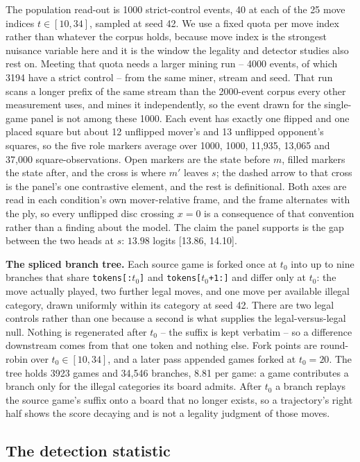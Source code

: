 The population read-out is 1000 strict-control events, 40 at each of the 25 move indices $t \in
[10, 34]$, sampled at seed 42. We use a fixed quota per move index rather than whatever the
corpus holds, because move index is the strongest nuisance variable here and it is the window the
legality and detector studies also rest on. Meeting that quota needs a larger mining run -- 4000
events, of which 3194 have a strict control -- from the same miner, stream and seed. That run scans a longer prefix of
the same stream than the 2000-event corpus every other measurement uses, and mines it
independently, so the event drawn for the single-game panel is not among these 1000. Each event has exactly one
flipped and one placed square but about 12 unflipped mover's and 13 unflipped opponent's squares,
so the five role markers average over 1000, 1000, 11,935, 13,065 and 37,000 square-observations.
Open markers are the state before $m$, filled markers the state after, and the cross is where
$m'$ leaves $s$; the dashed arrow to that cross is the panel's one contrastive element, and the
rest is definitional. Both axes are read in each condition's own mover-relative frame, and the
frame alternates with the ply, so every unflipped disc crossing $x = 0$ is a consequence of that
convention rather than a finding about the model. The claim the panel supports is the gap between
the two heads at $s$: $13.98$ logits [13.86, 14.10].

\textbf{The spliced branch tree.} Each source game is forked once at $t_0$ into up to nine branches
that share \texttt{tokens[:$t_0$]} and \texttt{tokens[$t_0$+1:]} and differ only at $t_0$: the
move actually played, two further legal moves, and one move per available illegal category, drawn
uniformly within its category at seed 42. There are two legal controls rather than one because a
second is what supplies the legal-versus-legal null. Nothing is regenerated after $t_0$ -- the
suffix is kept verbatim -- so a difference downstream comes from that one token and nothing
else. Fork points are round-robin over $t_0 \in [10, 34]$, and a later pass appended
games forked at $t_0 = 20$. The tree holds 3923 games and 34,546 branches, 8.81 per game: a game contributes a branch
only for the illegal categories its board admits. After $t_0$ a branch
replays the source game's suffix onto a board that no longer exists, so a trajectory's right half
shows the score decaying and is not a legality judgment of those moves.

\subsection{The detection statistic}

